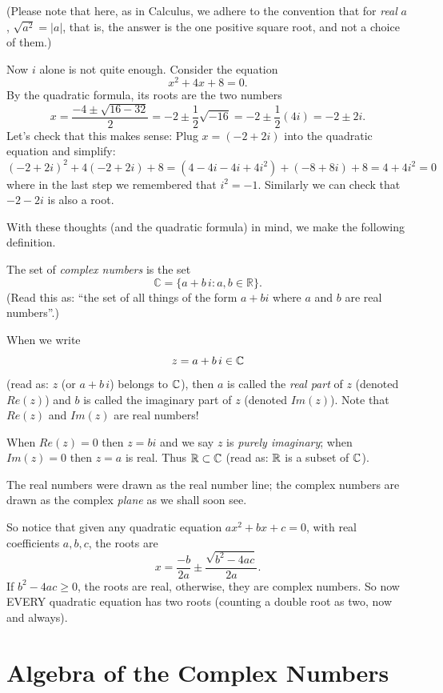 (Please note that here, as in Calculus, we adhere to the convention
that for \emph{real} $a$, $\sqrt{a^2} =\vert a \vert$, that is, the answer is the one
positive square root, and not a choice of them.)


  


Now $i$ alone is not quite enough.  Consider the equation
$$
x^2 + 4x + 8 = 0.
$$
By the quadratic formula, its roots are the two numbers
$$
x = \frac{-4 \pm \sqrt{16-32}}{2} = -2 \pm \frac12 \sqrt{-16} = -2 \pm \frac12 (4i) = -2 \pm 2i.
$$
Let's check that this makes sense:  Plug $x = (-2+2i)$ into the 
quadratic equation and simplify:
$$
(-2+2i)^2 + 4(-2+2i) + 8 = (4 -4i - 4i + 4i^2) + (-8 +8i) +8 = 4+4i^2 = 0 
$$
where in the last step we remembered that $i^2 = -1$.  Similarly we
can check that $-2-2i$ is also a root.  




With these thoughts (and the quadratic formula) 
in mind, we make the following definition.

\begin{definition}
The set of \emph{complex numbers} is the set 
$$
\mathbb{C} = \{ a+b\,i \colon a, b \in \mathbb{R} \}.
$$
(Read this as:  ``the set of all things of the form $a+bi$ where $a$ and
$b$ are real numbers''.)

When we write 
$$
z =a +b\,i \in \mathbb{C}
$$
(read as:  $z$ (or $a+b\,i$) belongs to $\mathbb{C}$), then
$a$ is called the \emph{real part} of $z$ (denoted $Re(z)$) and $b$ is called
the imaginary part of $z$ (denoted $Im(z)$).  Note that $Re(z)$ and $Im(z)$
are real numbers!

When $Re(z)=0$ then $z=bi$ and we say $z$ is \emph{purely imaginary};
when $Im(z)=0$ then $z=a$ is real.  Thus $\mathbb{R} \subset \mathbb{C}$ (read as:  $\mathbb{R}$
is a subset of $\mathbb{C}$).
\end{definition}

The real numbers were drawn as the real number line; the complex numbers
are drawn as the complex \emph{plane} as we shall soon see.  

 So notice that given any quadratic equation $ax^2+bx+c=0$, with real coefficients $a,b,c$, the roots are $$x = \frac{-b}{2a} \pm \frac{\sqrt{b^2-4ac}}{2a}. $$ If $b^2-4ac \geq 0$, the roots are real, otherwise, they are complex numbers.  So now EVERY quadratic equation has two roots (counting a double root as two, now and always). 

\section{Algebra of the Complex Numbers}

